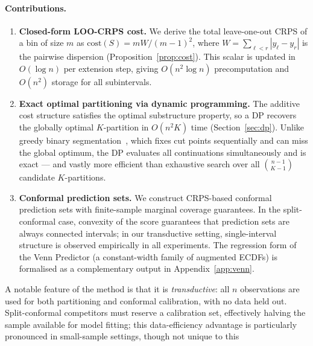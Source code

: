 \documentclass[11pt]{article}
\begin{document}
\paragraph{Contributions.}
\begin{enumerate}
  \item \textbf{Closed-form LOO-CRPS cost.}
    We derive the total leave-one-out CRPS of a bin of size $m$ as
    $\mathrm{cost}(S) = m W/(m-1)^2$, where $W = \sum_{\ell < r}|y_\ell - y_r|$ is the
    pairwise dispersion (Proposition~\ref{prop:cost}).
    This scalar is updated in $O(\log n)$ per extension step, giving $O(n^2 \log n)$
    precomputation and $O(n^2)$ storage for all subintervals.
  \item \textbf{Exact optimal partitioning via dynamic programming.}
    The additive cost structure satisfies the optimal substructure property, so a DP
    recovers the globally optimal $K$-partition in $O(n^2 K)$ time (Section~\ref{sec:dp}).
    Unlike greedy binary segmentation~\citep{AugerLawrence1989}, which fixes cut points
    sequentially and can miss the global optimum, the DP evaluates all continuations
    simultaneously and is exact --- and vastly more efficient than exhaustive search over
    all $\binom{n-1}{K-1}$ candidate $K$-partitions.
  \item \textbf{Conformal prediction sets.}
    We construct CRPS-based conformal prediction sets with finite-sample marginal coverage
    guarantees.  In the split-conformal case, convexity of the score guarantees that
    prediction sets are always connected intervals; in our transductive setting, single-interval
    structure is observed empirically in all experiments.
    The regression form of the Venn Predictor (a constant-width family of augmented ECDFs)
    is formalised as a complementary output in Appendix~\ref{app:venn}.
\end{enumerate}
A notable feature of the method is that it is \emph{transductive}: all $n$
observations are used for both partitioning and conformal calibration, with no
data held out.
Split-conformal competitors must reserve a calibration set, effectively halving
the sample available for model fitting; this data-efficiency advantage is
particularly pronounced in small-sample settings, though not unique to this
\end{document}
